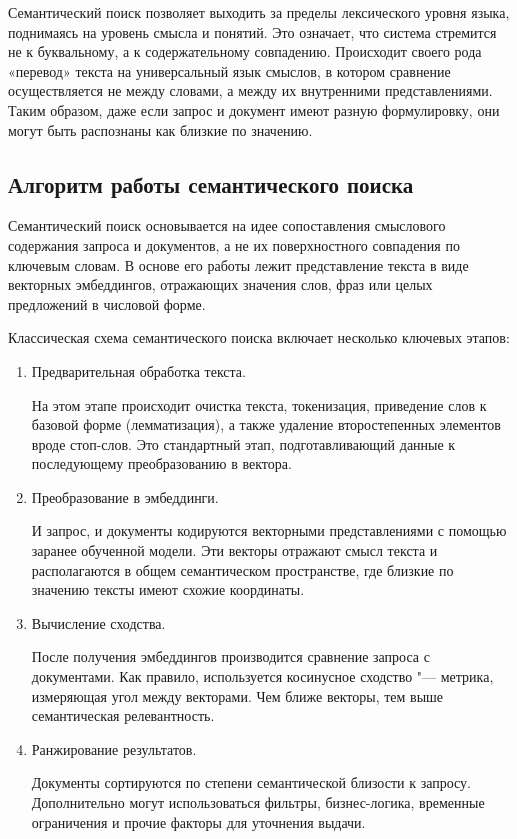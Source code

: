 \documentclass[coursework]{SCWorks}
\begin{document}
Семантический поиск позволяет выходить за пределы лексического уровня языка, поднимаясь на уровень смысла и понятий. Это означает, что система стремится не к буквальному, а к содержательному совпадению. Происходит своего рода «перевод» текста на универсальный язык смыслов, в котором сравнение осуществляется не между словами, а между их внутренними представлениями. Таким образом, даже если запрос и документ имеют разную формулировку, они могут быть распознаны как близкие по значению\cite{search}.

\subsection{Алгоритм работы семантического поиска}
Семантический поиск основывается на идее сопоставления смыслового содержания запроса и документов, а не их поверхностного совпадения по ключевым словам. В основе его работы лежит представление текста в виде векторных эмбеддингов, отражающих значения слов, фраз или целых предложений в числовой форме.

Классическая схема семантического поиска включает несколько ключевых этапов:
\begin{enumerate}
    \item Предварительная обработка текста.
    
На этом этапе происходит очистка текста, токенизация, приведение слов к базовой форме (лемматизация), а также удаление второстепенных элементов вроде стоп-слов. Это стандартный этап, подготавливающий данные к последующему преобразованию в вектора.

    \item Преобразование в эмбеддинги.
    
И запрос, и документы кодируются векторными представлениями с помощью заранее обученной модели. Эти векторы отражают смысл текста и располагаются в общем семантическом пространстве, где близкие по значению тексты имеют схожие координаты.

    \item Вычисление сходства.
    
После получения эмбеддингов производится сравнение запроса с документами. Как правило, используется косинусное сходство "--- метрика, измеряющая угол между векторами. Чем ближе векторы, тем выше семантическая релевантность.

    \item Ранжирование результатов.
    
Документы сортируются по степени семантической близости к запросу. Дополнительно могут использоваться фильтры, бизнес-логика, временные ограничения и прочие факторы для уточнения выдачи.
\end{enumerate}
\end{document}

